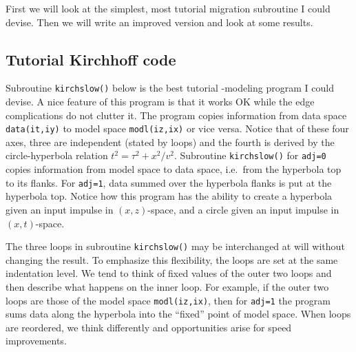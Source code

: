 First we will look at the simplest,
most tutorial migration subroutine I could devise.
Then we will write an improved version
and look at some results.

\subsection{Tutorial Kirchhoff code}

Subroutine {\tt kirchslow()} below is the best tutorial
-modeling program I could devise.
A nice feature of this program is that it works OK
while the edge complications do not clutter it.
The program copies information from data space {\tt data(it,iy)}
to model space {\tt modl(iz,ix)} or vice versa.
Notice that of these four axes,
three are independent (stated by loops)
and the fourth is derived by the circle-hyperbola
relation $t^2=\tau^2+x^2/v^2$.
Subroutine {\tt kirchslow()}
for {\tt adj=0} copies
information from model space to data space,
i.e.~from the hyperbola top to its flanks.
For {\tt adj=1}, data summed over the hyperbola flanks
is put at the hyperbola top.
Notice how this program has the ability to create a hyperbola
given an input impulse in $(x,z)$-space, and a circle
given an input impulse in $(x,t)$-space.

\par
The three loops in subroutine {\tt kirchslow()}
may be interchanged at will without changing the result.
To emphasize this flexibility, the loops are set at the same
indentation level.
We tend to think of fixed values of the outer two loops
and then describe what happens on the inner loop.
For example, if the outer two loops are those of the model space
{\tt modl(iz,ix)}, then
for {\tt adj=1} the program sums data along the hyperbola into
the ``fixed'' point of model space.
When loops are reordered,
we think differently
and opportunities arise for speed improvements.

